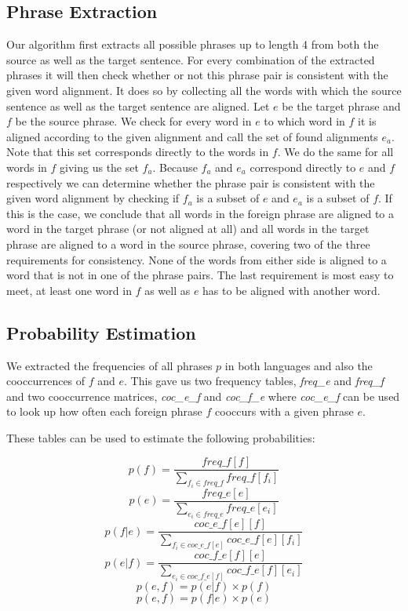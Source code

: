 \documentclass[11pt]{article}
\begin{document}
\subsection{Phrase Extraction}
\label{implem1}
Our algorithm first extracts all possible phrases up to length 4 from both the source as well as the target sentence. For every combination of the extracted phrases it will then check whether or not this phrase pair is consistent with the given word alignment. It does so by collecting all the words with which the source sentence as well as the target sentence are aligned. Let $e$ be the target phrase and $f$ be the source phrase. We check for every word in $e$ to which word in $f$ it is aligned according to the given alignment and call the set of found alignments $e_a$. Note that this set corresponds directly to the words in $f$. We do the same for all words in $f$ giving us the set $f_a$. Because $f_a$ and $e_a$ correspond directly to $e$ and $f$ respectively we can determine whether the phrase pair is consistent with the given word alignment by checking if $f_a$ is a subset of $e$ and $e_a$ is a subset of $f$. If this is the case, we conclude that all words in the foreign phrase are aligned to a word in the target phrase (or not aligned at all) and all words in the target phrase are aligned to a word in the source phrase, covering two of the three requirements for consistency. None of the words from either side is aligned to a word that is not in one of the phrase pairs. The last requirement is most easy to meet, at least one word in $f$ as well as $e$ has to be aligned with another word.

\subsection{Probability Estimation}
\label{implem3}
We extracted the frequencies of all phrases $p$ in both languages and also the cooccurrences of $f$ and $e$.
This gave us two frequency tables, \textit{freq\_e} and \textit{freq\_f} and two cooccurrence matrices, \textit{coc\_e\_f} and \textit{coc\_f\_e} where \textit{coc\_e\_f} can be used to look up how often each foreign phrase $f$ cooccurs with a given phrase $e$. 

These tables can be used to estimate the following probabilities:

$$ p(f) = \frac{freq\_f[f] }{  \sum_{f_i \in freq\_f} freq\_f[f_i]  } $$
$$ p(e) = \frac{freq\_e[e] }{  \sum_{e_i \in freq\_e} freq\_e[e_i]  } $$
$$ p(f|e) = \frac{coc\_e\_f[e][f]}{ \sum_{f_i \in coc\_e\_f[e]}  coc\_e\_f[e][f_i]} $$
$$ p(e|f) = \frac{coc\_f\_e[f][e]}{ \sum_{e_i \in coc\_f\_e[f]}  coc\_f\_e[f][e_i]} $$
$$ p(e, f) = p(e|f) \times p(f) $$
$$ p(e, f) = p(f|e) \times p(e) $$
\end{document}
